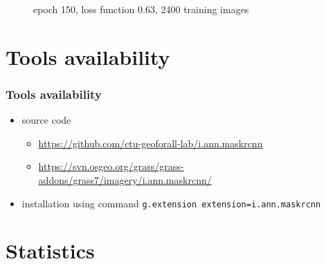 \documentclass{beamer}
\begin{document}
\begin{frame}
\begin{figure}[ht]
{	\caption{epoch 150, loss function 0.63, 2400 training images}}
\end{figure}

\end{frame}


\section{Tools availability}

\begin{frame}[fragile]

\frametitle{Tools availability}

\begin{itemize}
	\item source code
	\begin{itemize}
		\item \url{https://github.com/ctu-geoforall-lab/i.ann.maskrcnn}
		\item \url{https://svn.osgeo.org/grass/grass-addons/grass7/imagery/i.ann.maskrcnn/}
	\end{itemize}
	\item installation using command \verb|g.extension extension=i.ann.maskrcnn|
\end{itemize}

\end{frame}


\section{Statistics}
\end{document}
